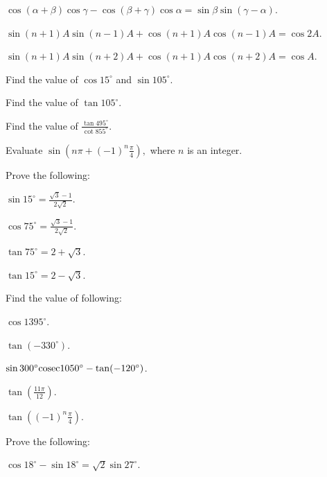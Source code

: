 \item $\cos(\alpha + \beta)\cos\gamma - \cos(\beta + \gamma)\cos\alpha = \sin\beta\sin(\gamma - \alpha)$.

\item $\sin(n + 1)A\sin(n - 1)A + \cos(n + 1)A\cos(n - 1)A = \cos 2A$.

\item $\sin(n + 1)A\sin(n + 2)A + \cos(n + 1)A\cos(n + 2)A = \cos A$.

\item Find the value of $\cos 15^\circ$ and $\sin 105^\circ$.

\item Find the value of $\tan 105^\circ$.

\item Find the value of $\frac{\tan 495^\circ}{\cot 855^\circ}$.

\item Evaluate $\sin\left(n\pi + (-1)^n \frac{\pi}{4}\right),$ where $n$ is an integer.
\stopitemize

Prove the following:

\item $\sin 15^\circ = \frac{\sqrt{3} - 1}{2\sqrt{2}}$.

\item $\cos 75^\circ = \frac{\sqrt{3} - 1}{2\sqrt{2}}$.

\item $\tan 75^\circ = 2 + \sqrt{3}$.

\item $\tan 15^\circ = 2 - \sqrt{3}$.
\stopitemize

Find the value of following:


\item $\cos 1395^\circ$.

\item $\tan(-330^\circ)$.

\item $\sin 300^\circ {\rm cosec} 1050^\circ - \tan(-120^\circ)$.

\item $\tan\left(\frac{11\pi}{12}\right)$.

\item $\tan \left((-1)^n\frac{\pi}{4}\right)$.
\stopitemize

Prove the following:

\item $\cos 18^\circ - \sin 18^\circ = \sqrt{2}\sin 27^\circ$.

